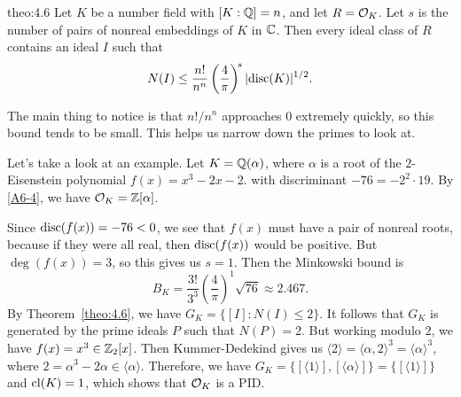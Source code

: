 \begin{theo}[Minkowski]{theo:4.6}
    Let $K$ be a number field with $[K : \mathbb{Q}] = n$, and let $R = {\cal O}_K$.
    Let $s$ is the number of pairs of nonreal embeddings of $K$ in $\mathbb{C}$. 
    Then every ideal class of $R$ contains an ideal $I$ such that 
    \[ N(I) \leq \frac{n!}{n^n} \left( \frac{4}{\pi} \right)^{\!s} \lvert\operatorname{disc}(K)\rvert^{1/2}. \]
\end{theo}\vspace{-0.25cm}

The main thing to notice is that $n!/n^n$ approaches $0$ extremely quickly, 
so this bound tends to be small. This helps us narrow down the 
primes to look at. 

Let's take a look at an example. Let $K = \mathbb{Q}(\alpha)$, where $\alpha$ 
is a root of the $2$-Eisenstein polynomial $f(x) = x^3 - 2x - 2$. 
with discriminant $-76 = -2^2 \cdot 19$. By \ref{A6-4}, we have 
${\cal O}_K = \mathbb{Z}[\alpha]$. 

Since $\operatorname{disc}(f(x)) = -76 < 0$, we see that $f(x)$ must have a pair of 
nonreal roots, because if they were all real, then $\operatorname{disc}(f(x))$ would 
be positive. But $\deg(f(x)) = 3$, so this gives us $s = 1$. 
Then the Minkowski bound is 
\[ B_K = \frac{3!}{3^3} \left( \frac{4}{\pi} \right)^{\!1} \sqrt{76} \approx 2.467. \] 
By Theorem~\ref{theo:4.6}, we have $G_K = \{[I] : N(I) \leq 2\}$.
It follows that $G_K$ is generated by the prime ideals $P$ such that $N(P) = 2$.
But working modulo $2$, we have $f(x) = x^3 \in \mathbb{Z}_2[x]$. Then Kummer-Dedekind 
gives us $\langle 2 \rangle = \langle \alpha, 2 \rangle^3 = \langle \alpha \rangle^3$, 
where $2 = \alpha^3 - 2\alpha \in \langle \alpha \rangle$. Therefore, 
we have $G_K = \{[\langle 1 \rangle], [\langle \alpha \rangle]\} = 
\{[\langle 1 \rangle]\}$ and $\operatorname{cl}(K) = 1$, which shows that ${\cal O}_K$ 
is a PID. 